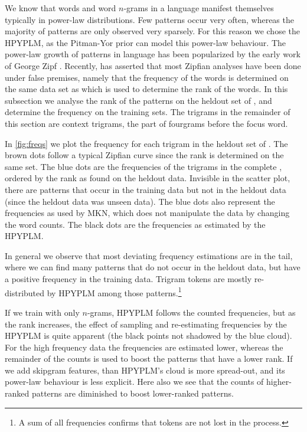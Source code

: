 We know that words and word $n$-grams in a language manifest themselves typically in power-law distributions. Few patterns occur very often, whereas the majority of patterns are only observed very sparsely. For this reason we chose the HPYPLM, as the Pitman-Yor prior can model this power-law behaviour. The power-law growth of patterns in language has been popularized by the early work of George Zipf \cite{Zipf35,Zipf49}. Recently, \cite{piantadosi2014Zipfs} has asserted that most Zipfian analyses have been done under false premises, namely that the frequency of the words is determined on the same data set as which is used to determine the rank of the words. In this subsection we analyse the rank of the patterns on the heldout set of \obw, and determine the frequency on the training sets. The trigrams in the remainder of this section are context trigrams, the part of fourgrams before the focus word.

In \cref{fig:freqs} we plot the frequency for each trigram in the heldout set of \obw. The brown dots
follow a typical Zipfian curve since the rank is determined on the same set. The blue dots are the frequencies of the trigrams in the complete \obw, ordered by the rank as found on the heldout data. Invisible in the scatter plot, there are patterns that occur in the training data but not in the heldout data (since the heldout data was unseen data).
The blue dots also represent the frequencies as used by MKN, which does not manipulate the data by changing the word counts. The black dots are the frequencies as estimated by the HPYPLM. 

In general we observe that most deviating frequency estimations are in the tail, where we can find many patterns that do not occur in the heldout data, but have a positive frequency in the training data. Trigram tokens are mostly re-distributed by HPYPLM among those patterns.\footnote{A sum of all frequencies confirms that tokens are not lost in the process.}

If we train with only $n$-grams, HPYPLM follows the counted frequencies, but as the rank increases, the effect of sampling and re-estimating frequencies by the HPYPLM is quite apparent (the black points not shadowed by the blue cloud). For the high frequency data the frequencies are estimated lower, whereas the remainder of the counts is used to boost the patterns that have a lower rank. If we add skipgram features, than HPYPLM's cloud is more spread-out, and its power-law behaviour is less explicit. Here also we see that the counts of higher-ranked patterns are diminished to boost lower-ranked patterns.

